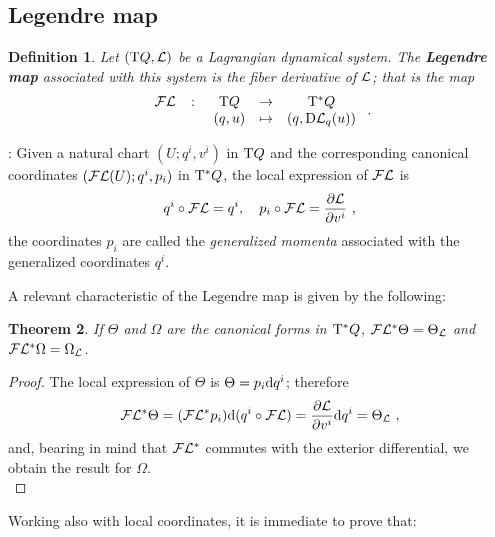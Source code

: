 \documentclass[12pt]{report}
\newtheorem{teor}{Theorem}[chapter]
\newtheorem{definition}[teor]{Definition}
\def\derpar#1#2{\frac{\partial{#1}}{\partial{#2}}}
\def\qed{\ifvmode\removelastskip\fi
{\unskip\nobreak\hfil\penalty50\hbox{}\nobreak\hfil
\hbox{\vrule height1.2ex width1.2ex}\parfillskip=0pt
\finalhyphendemerits=0 \par\smallskip}}
\def\Lag{{\cal L}}
\def\d{{\rm d}}
\def\Tan{{\rm T}}
\def\Leg{{\cal F}\Lag}
\begin{document}
\subsection{Legendre map}


\begin{definition}
Let $(\Tan Q,\Lag )$ be a Lagrangian dynamical system.
The \textbf{Legendre map} associated with this system
is the fiber derivative of $\Lag$; that is the map
$$
\begin{array}{ccccc}
\Leg & \colon & \Tan Q & \to & \Tan^*Q
\\
 & & (q,u) & \mapsto & (q,{\rm D}\Lag_q(u))
\end{array} \ .
$$
\end{definition}

:
Given a natural chart $(U;q^i,v^i)$ in $\Tan Q$
and the corresponding canonical coordinates
$(\Leg(U);q^i,p_i)$ in $\Tan^* Q$,
the local expression of $\Leg$ is
$$
q^i \circ \Leg = q^i ,\quad p_i \circ \Leg =\derpar{\Lag}{v^i} \ ,
$$
the coordinates $p_i$ are called the
{\sl generalized momenta} associated with the generalized coordinates $q^i$.

A relevant characteristic of the Legendre map is given by the following:

\begin{teor}
If $\Theta$ and $\Omega$ are the canonical forms in $\Tan^*Q$,
$\Leg^*\Theta =\Theta_\Lag$ and $\Leg^*\Omega =\Omega_\Lag$.
\end{teor}
\begin{proof}
The local expression of $\Theta$ is $\Theta =p_i\d q^i$; therefore
$$
\Leg^*\Theta = (\Leg^*p_i)\d (q^i\circ\Leg ) =
\derpar{\Lag}{v^i}\d q^i = \Theta_\Lag \ ,
$$
and, bearing in mind that $\Leg^*$ commutes with the exterior differential,
we obtain the result for $\Omega$.
\\ \qed \end{proof}

Working also with local coordinates, it is immediate to prove that:
\end{document}
